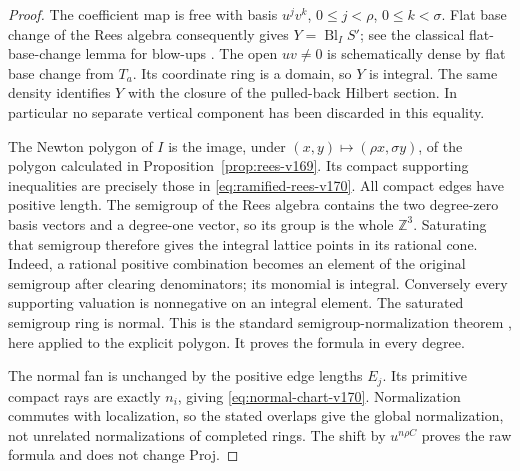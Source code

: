 \begin{proof}
The coefficient map is free with basis $u^jv^k$, $0\leq j<\rho$,
$0\leq k<\sigma$. Flat base change of the Rees algebra consequently
gives $Y=\operatorname{Bl}_I S'$; see the classical flat-base-change
lemma for blow-ups \cite{Stacks169}. The open $uv\ne0$ is
schematically dense by flat base change from $T_a$. Its coordinate
ring is a domain, so $Y$ is integral. The same density identifies
$Y$ with the closure of the pulled-back Hilbert section. In particular
no separate vertical component has been discarded in this equality.

The Newton polygon of $I$ is the image, under
$(x,y)\mapsto(\rho x,\sigma y)$, of the polygon calculated in
Proposition~\ref{prop:rees-v169}. Its compact supporting inequalities
are precisely those in \eqref{eq:ramified-rees-v170}. All compact
edges have positive length. The semigroup of the Rees algebra
contains the two degree-zero basis vectors and a degree-one vector,
so its group is the whole $\mathbb Z^3$. Saturating that semigroup
therefore gives the integral lattice points in its rational cone.
Indeed, a rational positive combination becomes an element of the
original semigroup after clearing denominators; its monomial is
integral. Conversely every supporting valuation is nonnegative on
an integral element. The saturated semigroup ring is normal. This
is the standard semigroup-normalization theorem
\cite[Proposition~5 and Section~2.6]{GonzalezTeissier170}, here applied
to the explicit polygon. It proves the formula in every degree.

The normal fan is unchanged by the positive edge lengths $E_j$.
Its primitive compact rays are exactly $n_i$, giving
\eqref{eq:normal-chart-v170}. Normalization commutes with localization,
so the stated overlaps give the global normalization, not unrelated
normalizations of completed rings. The shift by $u^{n\rho C}$ proves
the raw formula and does not change Proj.
\end{proof}

